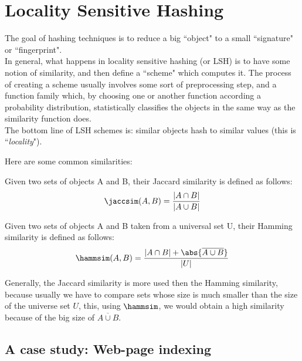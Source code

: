 \chapter{Locality Sensitive Hashing}
	
The goal of hashing techniques is to reduce a big ``object" to a small ``signature" or ``fingerprint".\\
In general, what happens in locality sensitive hashing (or LSH) is to have some notion of similarity, and then define a ``scheme" which computes it. The process of creating a scheme usually involves some sort of preprocessing step, and a function family which, by choosing one or another function according a probability distribution, statistically classifies the objects in the same way as the similarity function does.\\
The bottom line of LSH schemes is: similar objects hash to similar values (this is ``\textit{locality}").

Here are some common similarities:

\begin{defn}
	Given two sets of objects A and B, their Jaccard similarity is defined as follows:
	\begin{equation}
	\jaccsim(A, B) = \frac{|A\cap B|}{|A\cup B|}
	\end{equation}
\end{defn}

\begin{defn}
	Given two sets of objects A and B taken from a universal set U, their Hamming similarity is defined as follows:
	\begin{equation}
	\hammsim(A, B) = \frac{|A\cap B| + \abs{\overline{A\cup B}}}{|U|}
	\end{equation}
\end{defn}

\begin{obs}
	Generally, the Jaccard similarity is more used then the Hamming similarity, because usually we have to compare sets whose size is much smaller than the size of the universe set $U$, this, using $\hammsim$, we would obtain a high similarity because of the big size of $\overline{A\cup B}$.
\end{obs}


\section{A case study: Web-page indexing}\label{sec:web-page-indexing}
	
